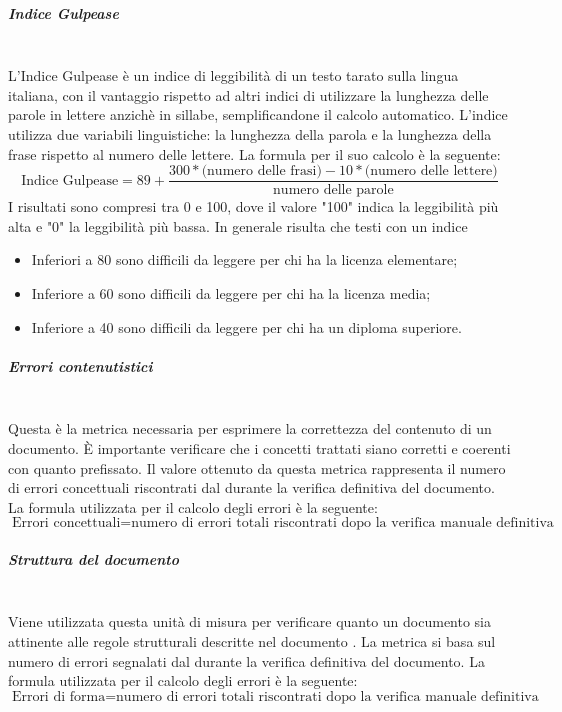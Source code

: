\subparagraph{Indice Gulpease}
\label{AppB:IndiceGulpease}
~\\L'{Indice Gulpease} è un indice di leggibilità di un testo tarato sulla lingua italiana, con il vantaggio rispetto ad altri indici di utilizzare la lunghezza delle parole in lettere anzichè in sillabe, semplificandone il calcolo automatico. L'indice utilizza due variabili linguistiche: la lunghezza della parola e la lunghezza della frase rispetto al numero delle lettere.
\newline La formula per il suo calcolo è la seguente:
\begin{displaymath}
	\mbox{{Indice Gulpease}}= 89+\frac{300*\mbox{(numero delle frasi)}-10*\mbox{(numero delle lettere)}}{\mbox{numero delle parole}}
\end{displaymath}
I risultati sono compresi tra 0 e 100, dove il valore "100" indica la leggibilità più alta e "0" la leggibilità più bassa. In generale risulta che testi con un indice
\begin{itemize}
	\item Inferiori a 80 sono difficili da leggere per chi ha la licenza elementare;
	\item Inferiore a 60 sono difficili da leggere per chi ha la licenza media;
	\item Inferiore a 40 sono difficili da leggere per chi ha un diploma superiore.
\end{itemize}

\subparagraph{Errori contenutistici}
\label{AppB:ErroriCont}
~\\Questa è la metrica necessaria per esprimere la correttezza del contenuto di un documento. È importante verificare che i concetti trattati siano corretti e coerenti con quanto prefissato. Il valore ottenuto da questa metrica rappresenta il numero di errori concettuali riscontrati dal \ver{} durante la verifica definitiva del documento.
\newline La formula utilizzata per il calcolo degli errori è la seguente:
\begin{displaymath}
	\mbox{Errori concettuali}={\mbox{numero di errori totali riscontrati dopo la verifica manuale definitiva}}
\end{displaymath}

\subparagraph{Struttura del documento}
\label{AppB:ErroriForma}
~\\Viene utilizzata questa unità di misura per verificare quanto un documento sia attinente alle regole strutturali descritte nel documento \NdP{}.
La metrica si basa sul numero di errori segnalati dal \ver{} durante la verifica definitiva del documento.
\newline La formula utilizzata per il calcolo degli errori è la seguente:
\begin{displaymath}
	\mbox{Errori di forma}={\mbox{numero di errori totali riscontrati dopo la verifica manuale definitiva}}
\end{displaymath}

